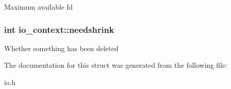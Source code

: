 \label{structio__context_af59f406dc073350e6babc8eddd4e0872}
Maximum available fd \hypertarget{structio__context_ae910ea202fa1769e63e4680b70888b3a}{
\subsubsection[{needshrink}]{\setlength{\rightskip}{0pt plus 5cm}int {\bf io\_\-context::needshrink}}}
\label{structio__context_ae910ea202fa1769e63e4680b70888b3a}
Whether something has been deleted 

The documentation for this struct was generated from the following file:\begin{DoxyCompactItemize}
\item 
io.h\end{DoxyCompactItemize}
